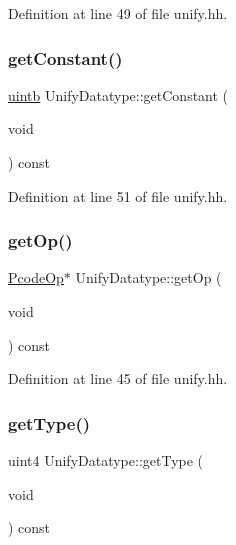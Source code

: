 Definition at line 49 of file unify.\+hh.

\mbox{\label{class_unify_datatype_a021723137b85219d7638dc4a4681ad7e}} 
\subsubsection{\texorpdfstring{getConstant()}{getConstant()}}
{\footnotesize\ttfamily \mbox{\hyperlink{types_8h_a2db313c5d32a12b01d26ac9b3bca178f}{uintb}} Unify\+Datatype\+::get\+Constant (\begin{DoxyParamCaption}\item[{void}]{ }\end{DoxyParamCaption}) const\hspace{0.3cm}{\ttfamily [inline]}}



Definition at line 51 of file unify.\+hh.

\mbox{\label{class_unify_datatype_acd27c8c5ffc92a6a16f5eb195b505331}} 
\subsubsection{\texorpdfstring{getOp()}{getOp()}}
{\footnotesize\ttfamily \mbox{\hyperlink{class_pcode_op}{Pcode\+Op}}$\ast$ Unify\+Datatype\+::get\+Op (\begin{DoxyParamCaption}\item[{void}]{ }\end{DoxyParamCaption}) const\hspace{0.3cm}{\ttfamily [inline]}}



Definition at line 45 of file unify.\+hh.

\mbox{\label{class_unify_datatype_a43799672b1fb3a66ecef454317fb749b}} 
\subsubsection{\texorpdfstring{getType()}{getType()}}
{\footnotesize\ttfamily uint4 Unify\+Datatype\+::get\+Type (\begin{DoxyParamCaption}\item[{void}]{ }\end{DoxyParamCaption}) const\hspace{0.3cm}{\ttfamily [inline]}}



